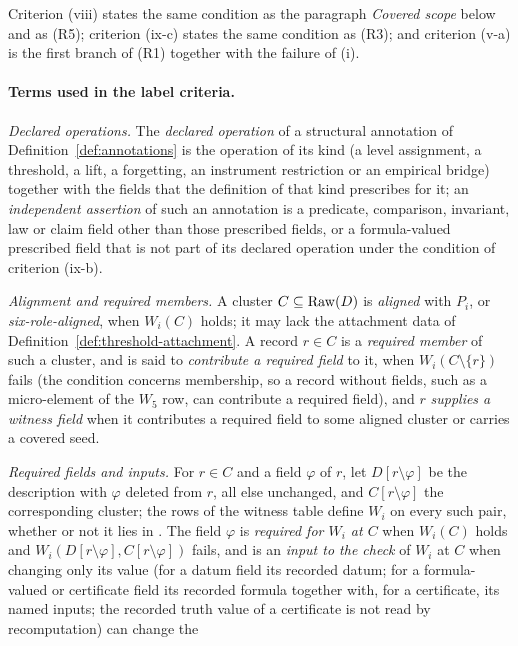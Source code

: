 Criterion (viii) states the same condition as the paragraph \emph{Covered scope} below and as (R5); criterion (ix-c) states the same condition as (R3); and criterion (v-a) is the first branch of (R1) together with the failure of (i).

\paragraph{Terms used in the label criteria.}
\emph{Declared operations.} The \emph{declared operation} of a structural annotation of
Definition~\ref{def:annotations} is the operation of its kind (a level
assignment, a threshold, a lift, a forgetting, an instrument restriction or an
empirical bridge) together with the fields that the definition of that kind
prescribes for it; an \emph{independent assertion} of such an annotation is a
predicate, comparison, invariant, law or claim field other than those
prescribed fields, or a formula-valued prescribed field that is not part of
its declared operation under the condition of criterion (ix-b).
\par\smallskip\noindent\emph{Alignment and required members.} A cluster \(C\subseteq\operatorname{Raw}\!\left(D\right)\) is \emph{aligned} with \(P_i\), or
\emph{six-role-aligned}, when \(W_i(C)\) holds; it may lack the attachment
data of Definition~\ref{def:threshold-attachment}. A record \(r\in C\) is a \emph{required member} of such a cluster, and is said
to \emph{contribute a required field} to it, when
\(W_i(C\setminus\{r\})\) fails (the condition concerns membership, so a record
without fields, such as a micro-element of the \(W_5\) row, can contribute a
required field), and \(r\) \emph{supplies a witness field}
when it contributes a required field to some aligned cluster or carries a
covered seed. \par\noindent\emph{Required fields and inputs.} For \(r\in C\) and a field \(\varphi\) of \(r\), let \(D[r\setminus\varphi]\) be
the description with \(\varphi\) deleted from \(r\), all else unchanged, and
\(C[r\setminus\varphi]\) the corresponding cluster; the rows of the witness table
define \(W_i\) on every such pair, whether or not it lies in \FATCD{}. The field
\(\varphi\) is \emph{required for \(W_i\) at \(C\)} when \(W_i(C)\) holds and
\(W_i(D[r\setminus\varphi],C[r\setminus\varphi])\) fails, and is an \emph{input to
the check} of \(W_i\) at \(C\) when changing only its value (for a datum
field its recorded datum; for a formula-valued or certificate field its
recorded formula together with, for a certificate, its named inputs; the
recorded truth value of a certificate is not read by recomputation) can change the
